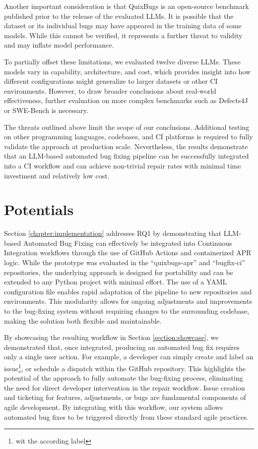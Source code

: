 Another important consideration is that QuixBugs is an open-source benchmark published prior to the release of the evaluated LLMs. It is possible that the dataset or its individual bugs may have appeared in the training data of some models. While this cannot be verified, it represents a further threat to validity and may inflate model performance.

To partially offset these limitations, we evaluated twelve diverse LLMs. These models vary in capability, architecture, and cost, which provides insight into how different configurations might generalize to larger datasets or other CI environments. However, to draw broader conclusions about real-world effectiveness, further evaluation on more complex benchmarks such as Defects4J or SWE-Bench is necessary.

The threats outlined above limit the scope of our conclusions. Additional testing on other programming languages, codebases, and CI platforms is required to fully validate the approach at production scale. Nevertheless, the results demonstrate that an LLM-based automated bug fixing pipeline can be successfully integrated into a CI workflow and can achieve non-trivial repair rates with minimal time investment and relatively low cost.

\section{Potentials}

Section \ref{chapter:implementation} addresses RQ1 by demonstrating that LLM-based Automated Bug Fixing can effectively be integrated into Continuous Integration workflows through the use of GitHub Actions and containerized APR logic. While the prototype was evaluated in the ``quixbugs-apr'' and ``bugfix-ci'' repositories, the underlying approach is designed for portability and can be extended to any Python project with minimal effort. The use of a YAML configuration file enables rapid adaptation of the pipeline to new repositories and environments. This modularity allows for ongoing adjustments and improvements to the bug-fixing system without requiring changes to the surrounding codebase, making the solution both flexible and maintainable.

By showcasing the resulting workflow in Section \ref{section:showcase}, we demonstrated that, once integrated, producing an automated bug fix requires only a single user action. For example, a developer can simply create and label an issue\footnote{wit the according label}, or schedule a dispatch within the GitHub repository. This highlights the potential of the approach to fully automate the bug-fixing process, eliminating the need for direct developer intervention in the repair workflow. Issue creation and ticketing for features, adjustments, or bugs are fundamental components of agile development. By integrating with this workflow, our system allows automated bug fixes to be triggered directly from these standard agile practices.

